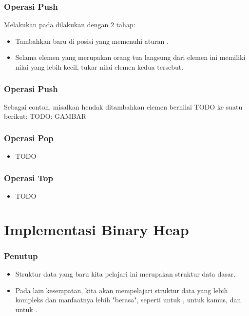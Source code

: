 \begin{frame}
\frametitle{Operasi Push}
Melakukan  pada \pbinaryHeap dilakukan dengan 2 tahap:
\begin{itemize}
  \item Tambahkan \fnode baru di posisi yang memenuhi aturan .
  \item Selama elemen \fnode yang merupakan orang tua langsung dari elemen ini memiliki nilai yang lebih kecil, tukar nilai elemen kedua \fnode tersebut.
\end{itemize}
\end{frame}

\begin{frame}
\frametitle{Operasi Push}
Sebagai contoh, misalkan hendak ditambahkan elemen bernilai TODO ke suatu \pbinaryHeap berikut:
TODO: GAMBAR
\end{frame}

\begin{frame}
\frametitle{Operasi Pop}
\begin{itemize}
  \item TODO
\end{itemize}
\end{frame}

\begin{frame}
\frametitle{Operasi Top}
\begin{itemize}
  \item TODO
\end{itemize}
\end{frame}

\section{Implementasi Binary Heap}
\frame{\sectionpage}

\begin{frame}
\frametitle{Penutup}
\begin{itemize}
  \item Struktur data yang baru kita pelajari ini merupakan struktur data dasar.
  \item Pada lain kesempatan, kita akan mempelajari struktur data yang lebih kompleks dan manfaatnya lebih "berasa", seperti  untuk ,  untuk kamus, dan  untuk .
\end{itemize}
\end{frame}




